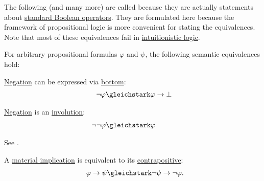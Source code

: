 \begin{proposition}\label{thm:boolean_equivalences}
  The following (and many more) are called  because they are actually statements about \hyperref[def:standard_boolean_operators]{standard Boolean operators}. They are formulated here because the framework of propositional logic is more convenient for stating the equivalences. Note that most of these equivalences fail in \hyperref[def:intuitionistic_propositional_axiomatic_derivation_system]{intuitionistic logic}.

  For arbitrary propositional formulas \( \varphi \) and \( \psi \), the following semantic equivalences hold:
  \begin{thmenum}
     \hyperref[def:propositional_language/negation]{Negation} can be expressed via \hyperref[def:propositional_language/constants/bottom]{bottom}:
    \begin{equation}\label{eq:thm:boolean_equivalences/negation_bottom}
      \begin{aligned}
        \mathllap{\neg \varphi} &\gleichstark \mathrlap{\varphi \rightarrow \bot}.
      \end{aligned}
    \end{equation}

     \hyperref[def:propositional_language/negation]{Negation} is an \hyperref[def:function/involution]{involution}:
    \begin{equation}\label{eq:thm:boolean_equivalences/double_negation}
      \begin{aligned}
        \mathllap{\neg \neg \varphi} &\gleichstark \mathrlap{\varphi}.
      \end{aligned}
    \end{equation}

    See .

     A \hyperref[def:material_implication]{material implication} is equivalent to its \hyperref[def:material_implication/contrapositive]{contrapositive}:
    \begin{equation}\label{eq:thm:boolean_equivalences/contrapositive}
      \begin{aligned}
        \mathllap{\varphi \rightarrow \psi} &\gleichstark \mathrlap{\neg \psi \rightarrow \neg \varphi.}
      \end{aligned}
    \end{equation}


\end{thmenum}
\end{proposition}
